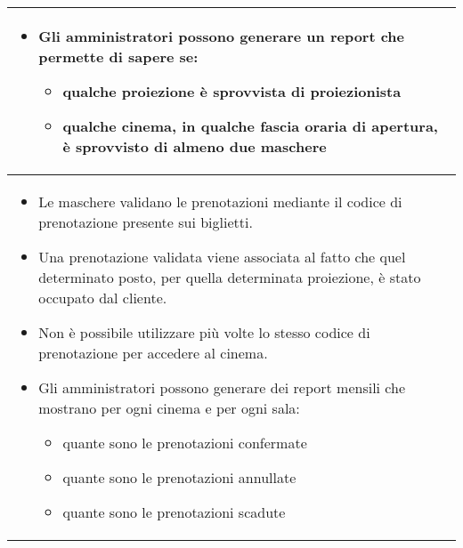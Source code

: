 \begin{longtable}{|p{\linewidth}|}
\begin{itemize}
        \item Gli amministratori possono generare un report che permette di
              sapere se:
              \begin{itemize}
                  \item qualche proiezione è sprovvista di proiezionista
                  \item qualche cinema, in qualche fascia oraria di apertura,
                        è sprovvisto di almeno due maschere
              \end{itemize}
    \end{itemize}
    \\\hline
    \begin{itemize}
        \item Le maschere validano le prenotazioni mediante il codice
              di prenotazione presente sui biglietti.
        \item Una prenotazione validata viene associata al fatto che quel
              determinato posto, per quella determinata proiezione,
              è stato occupato dal cliente.
        \item Non è possibile utilizzare più volte lo stesso codice di
              prenotazione per accedere al cinema.
        \item Gli amministratori possono generare dei report mensili che
              mostrano per ogni cinema e per ogni sala:
              \begin{itemize}
                  \item quante sono le prenotazioni confermate
                  \item quante sono le prenotazioni annullate
                  \item quante sono le prenotazioni scadute
              \end{itemize}
    \end{itemize}
    \\\hline
\end{longtable}

\pagebreak

